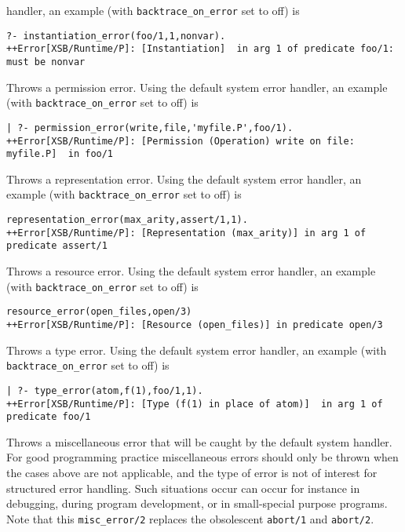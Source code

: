 \begin{description}
handler, an example (with {\tt backtrace\_on\_error} set to off) is 
{\small 
\begin{verbatim}
?- instantiation_error(foo/1,1,nonvar).
++Error[XSB/Runtime/P]: [Instantiation]  in arg 1 of predicate foo/1: must be nonvar
\end{verbatim}
}
%
Throws a permission error.  Using the default system error
handler, an example (with {\tt backtrace\_on\_error} set to off) is 
{\small 
\begin{verbatim}
| ?- permission_error(write,file,'myfile.P',foo/1).
++Error[XSB/Runtime/P]: [Permission (Operation) write on file: myfile.P]  in foo/1
\end{verbatim}
}
%
Throws a representation error.  Using the default system error handler, an
example (with {\tt backtrace\_on\_error} set to off) is {\small
\begin{verbatim}
representation_error(max_arity,assert/1,1).
++Error[XSB/Runtime/P]: [Representation (max_arity)] in arg 1 of predicate assert/1
\end{verbatim} }
%
Throws a resource error.  Using the default system error handler, an
example (with {\tt backtrace\_on\_error} set to off) is {\small
\begin{verbatim}
resource_error(open_files,open/3)
++Error[XSB/Runtime/P]: [Resource (open_files)] in predicate open/3
\end{verbatim} }
%
Throws a type error.  Using the default system error
handler, an example (with {\tt backtrace\_on\_error} set to off) is 
{\small 
\begin{verbatim}
| ?- type_error(atom,f(1),foo/1,1).
++Error[XSB/Runtime/P]: [Type (f(1) in place of atom)]  in arg 1 of predicate foo/1
\end{verbatim}
}
%
 Throws a miscellaneous error that will
be caught by the default system handler.  For good programming
practice miscellaneous errors should only be thrown when the cases
above are not applicable, and the type of error is not of interest for
structured error handling.  Such situations occur can occur for
instance in debugging, during program development, or in small-special
purpose programs.  Note that this {\tt misc\_error/2} replaces the
obsolescent {\tt abort/1} and {\tt abort/2}.
%
\end{description}
